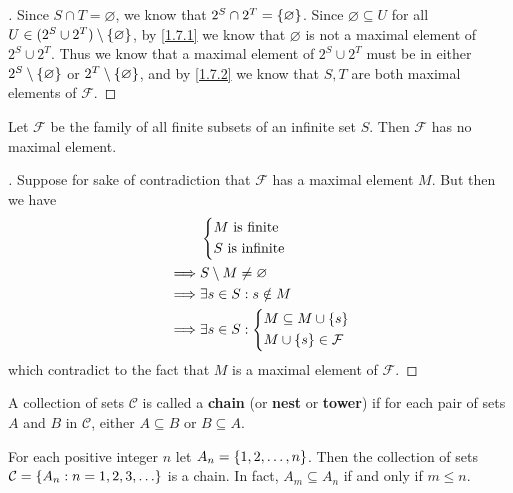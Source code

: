 \begin{proof}[]
  Since \(S \cap T = \varnothing\), we know that \(2^S \cap 2^T = \left\lbrace\varnothing\right\rbrace\).
  Since \(\varnothing \subseteq U\) for all \(U \in (2^S \cup 2^T) \setminus \left\lbrace\varnothing\right\rbrace\), by \cref{1.7.1} we know that \(\varnothing\) is not a maximal element of \(2^S \cup 2^T\).
  Thus we know that a maximal element of \(2^S \cup 2^T\) must be in either \(2^S \setminus \left\lbrace\varnothing\right\rbrace\) or \(2^T \setminus \left\lbrace\varnothing\right\rbrace\), and by \cref{1.7.2} we know that \(S, T\) are both maximal elements of \(\mathcal{F}\).
\end{proof}

\begin{eg}\label{1.7.4}
  Let \(\mathcal{F}\) be the family of all finite subsets of an infinite set \(S\).
  Then \(\mathcal{F}\) has no maximal element.
\end{eg}

\begin{proof}[]
  Suppose for sake of contradiction that \(\mathcal{F}\) has a maximal element \(M\).
  But then we have
  \begin{align*}
             & \begin{dcases}
      M \text{ is finite} \\
      S \text{ is infinite}
    \end{dcases}                    \\
    \implies & S \setminus M \neq \varnothing               \\
    \implies & \exists s \in S : s \notin M                 \\
    \implies & \exists s \in S : \begin{dcases}
      M \subseteq M \cup \left\lbrace s\right\rbrace \\
      M \cup \left\lbrace s\right\rbrace \in \mathcal{F}
    \end{dcases}
  \end{align*}
  which contradict to the fact that \(M\) is a maximal element of \(\mathcal{F}\).
\end{proof}

\begin{defn}\label{1.7.5}
  A collection of sets \(\mathcal{C}\) is called a \textbf{chain} (or \textbf{nest} or \textbf{tower}) if for each pair of sets \(A\) and \(B\) in \(\mathcal{C}\), either \(A \subseteq B\) or \(B \subseteq A\).
\end{defn}

\begin{eg}\label{1.7.6}
  For each positive integer \(n\) let \(A_n = \left\lbrace1, 2, \dots, n\right\rbrace\).
  Then the collection of sets \(\mathcal{C} = \set{A_n : n = 1, 2, 3, \dots}\) is a chain.
  In fact, \(A_m \subseteq A_n\) if and only if \(m \leq n\).
\end{eg}

